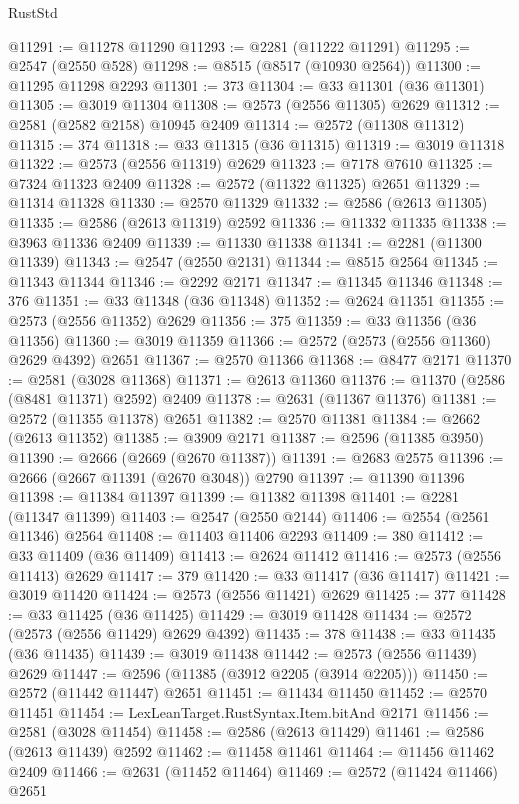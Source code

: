 \begin{lexlean}{RustStd}
\begin{coremodule}
@11291 := @11278 @11290
@11293 := @2281 (@11222 @11291)
@11295 := @2547 (@2550 @528)
@11298 := @8515 (@8517 (@10930 @2564))
@11300 := @11295 @11298 @2293
@11301 := 373
@11304 := @33 @11301 (@36 @11301)
@11305 := @3019 @11304
@11308 := @2573 (@2556 @11305) @2629
@11312 := @2581 (@2582 @2158) @10945 @2409
@11314 := @2572 (@11308 @11312)
@11315 := 374
@11318 := @33 @11315 (@36 @11315)
@11319 := @3019 @11318
@11322 := @2573 (@2556 @11319) @2629
@11323 := @7178 @7610
@11325 := @7324 @11323 @2409
@11328 := @2572 (@11322 @11325) @2651
@11329 := @11314 @11328
@11330 := @2570 @11329
@11332 := @2586 (@2613 @11305)
@11335 := @2586 (@2613 @11319) @2592
@11336 := @11332 @11335
@11338 := @3963 @11336 @2409
@11339 := @11330 @11338
@11341 := @2281 (@11300 @11339)
@11343 := @2547 (@2550 @2131)
@11344 := @8515 @2564
@11345 := @11343 @11344
@11346 := @2292 @2171
@11347 := @11345 @11346
@11348 := 376
@11351 := @33 @11348 (@36 @11348)
@11352 := @2624 @11351
@11355 := @2573 (@2556 @11352) @2629
@11356 := 375
@11359 := @33 @11356 (@36 @11356)
@11360 := @3019 @11359
@11366 := @2572 (@2573 (@2556 @11360) @2629 @4392) @2651
@11367 := @2570 @11366
@11368 := @8477 @2171
@11370 := @2581 (@3028 @11368)
@11371 := @2613 @11360
@11376 := @11370 (@2586 (@8481 @11371) @2592) @2409
@11378 := @2631 (@11367 @11376)
@11381 := @2572 (@11355 @11378) @2651
@11382 := @2570 @11381
@11384 := @2662 (@2613 @11352)
@11385 := @3909 @2171
@11387 := @2596 (@11385 @3950)
@11390 := @2666 (@2669 (@2670 @11387))
@11391 := @2683 @2575
@11396 := @2666 (@2667 @11391 (@2670 @3048)) @2790
@11397 := @11390 @11396
@11398 := @11384 @11397
@11399 := @11382 @11398
@11401 := @2281 (@11347 @11399)
@11403 := @2547 (@2550 @2144)
@11406 := @2554 (@2561 @11346) @2564
@11408 := @11403 @11406 @2293
@11409 := 380
@11412 := @33 @11409 (@36 @11409)
@11413 := @2624 @11412
@11416 := @2573 (@2556 @11413) @2629
@11417 := 379
@11420 := @33 @11417 (@36 @11417)
@11421 := @3019 @11420
@11424 := @2573 (@2556 @11421) @2629
@11425 := 377
@11428 := @33 @11425 (@36 @11425)
@11429 := @3019 @11428
@11434 := @2572 (@2573 (@2556 @11429) @2629 @4392)
@11435 := 378
@11438 := @33 @11435 (@36 @11435)
@11439 := @3019 @11438
@11442 := @2573 (@2556 @11439) @2629
@11447 := @2596 (@11385 (@3912 @2205 (@3914 @2205)))
@11450 := @2572 (@11442 @11447) @2651
@11451 := @11434 @11450
@11452 := @2570 @11451
@11454 := LexLeanTarget.RustSyntax.Item.bitAnd @2171
@11456 := @2581 (@3028 @11454)
@11458 := @2586 (@2613 @11429)
@11461 := @2586 (@2613 @11439) @2592
@11462 := @11458 @11461
@11464 := @11456 @11462 @2409
@11466 := @2631 (@11452 @11464)
@11469 := @2572 (@11424 @11466) @2651

\end{coremodule}
\end{lexlean}
